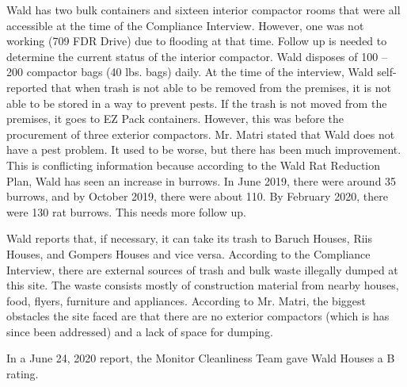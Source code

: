Wald has two bulk containers and sixteen interior compactor rooms that were all accessible at the time of the Compliance Interview. However, one was not working (709 FDR Drive) due to flooding at that time. Follow up is needed to determine the current status of the interior compactor. Wald disposes of 100 -- 200 compactor bags (40 lbs. bags) daily. At the time of the interview, Wald self-reported that when trash is not able to be removed from the premises, it is not able to be stored in a way to prevent pests. If the trash is not moved from the premises, it goes to EZ Pack containers. However, this was before the procurement of three exterior compactors. Mr. Matri stated that Wald does not have a pest problem. It used to be worse, but there has been much improvement. This is conflicting information because according to the Wald Rat Reduction Plan, Wald has seen an increase in burrows.  In June 2019, there were around 35 burrows, and by October 2019, there were about 110. By February 2020, there were 130 rat burrows. This needs more follow up.



Wald reports that, if necessary, it can take its trash to Baruch Houses, Riis Houses, and Gompers Houses and vice versa. According to the Compliance Interview, there are external sources of trash and bulk waste illegally dumped at this site. The waste consists mostly of construction material from nearby houses, food, flyers, furniture and appliances. According to Mr. Matri, the biggest obstacles the site faced are that there are no exterior compactors (which is has since been addressed) and a lack of space for dumping.

 

In a June 24, 2020 report, the Monitor Cleanliness Team gave Wald Houses a B rating.